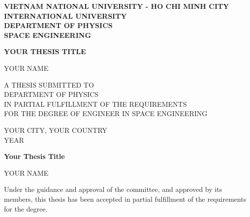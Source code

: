 
\thispagestyle{empty} %
\begin{titlepage}
    \begin{center}
        \textbf{VIETNAM NATIONAL UNIVERSITY - HO CHI MINH CITY}\\
        \textbf{INTERNATIONAL UNIVERSITY}\\
        \textbf{DEPARTMENT OF PHYSICS}\\
        \textbf{SPACE ENGINEERING}

        \vspace{1.5cm}


        \vspace{1cm}

        \fontsize{22}{26}\selectfont
        \textbf{YOUR THESIS TITLE}

        \vspace{1.25cm}

        \fontsize{14}{16}\selectfont
        YOUR NAME

        \vspace{1.5cm}

        \fontsize{12}{14}\selectfont
        A THESIS SUBMITTED TO\\
        DEPARTMENT OF PHYSICS\\
        IN PARTIAL FULFILLMENT OF THE REQUIREMENTS\\
        FOR THE DEGREE OF ENGINEER IN SPACE ENGINEERING

        \vfill %

        \fontsize{14}{16}\selectfont
        YOUR CITY, YOUR COUNTRY\\
        YEAR
    \end{center}
\end{titlepage}

\begin{center}
    \fontsize{14}{16}\selectfont
    \textbf{Your Thesis Title}

    \vspace{1.25cm}

    \fontsize{14}{16}\selectfont
    YOUR NAME
\end{center}
\doublespacing
\justifying
\noindent Under the guidance and approval of the committee, and approved by its members, this thesis has been accepted in partial fulfillment of the requirements for the degree.

